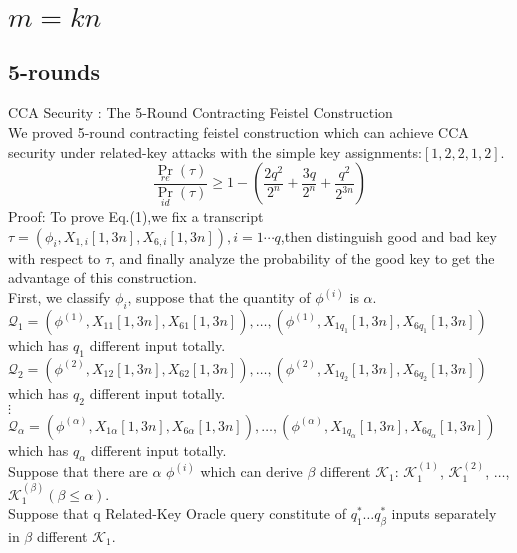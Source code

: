 \documentclass{article}
\begin{document}
\section{$m=kn$}
\subsection{5-rounds}
CCA Security : The 5-Round Contracting Feistel Construction\\
We proved 5-round contracting feistel construction which can achieve CCA security under related-key attacks with the simple key assignments:$[1,2,2,1,2]$.\\
\begin{equation}
\frac{\Pr_{re}(\tau)}{\Pr_{id}(\tau)}\geq 1-( \frac{2q^{2}}{2^{n}}+\frac{3q}{2^{n}} +\frac{q^{2}}{2^{3n}})
\end{equation}
Proof:
To prove Eq.(1),we fix a transcript $\tau=(\phi_{i},X_{1,i}[1,3n],X_{6,i}[1,3n]),i=1\cdots q$,then distinguish good and bad key with respect to $\tau$, and finally analyze the probability of the good key to get the advantage of this construction.\\


First, we classify $\phi_{i}$, suppose that the quantity of $\phi^{(i)}$ is $\alpha$.\\
$\mathcal{Q}_{1}={(\phi^{(1)},X_{11}[1,3n],X_{61}[1,3n]),\dots,(\phi^{(1)},X_{1q_{1}}[1,3n],X_{6q_{1}}[1,3n])}$ which has $q_{1}$ different input totally.\\
$\mathcal{Q}_{2}={(\phi^{(2)},X_{12}[1,3n],X_{62}[1,3n]),\dots,(\phi^{(2)},X_{1q_{2}}[1,3n],X_{6q_{2}}[1,3n])}$    which has $q_{2}$ different input totally.\\
\quad \quad $\vdots$ \\
$\mathcal{Q}_{\alpha}={(\phi^{(\alpha)},X_{1\alpha}[1,3n],X_{6\alpha}[1,3n]),\dots,(\phi^{(\alpha)},X_{1q_{\alpha}}[1,3n],X_{6q_{\alpha}}[1,3n])}$ which has $q_{\alpha}$ different input totally.\\

Suppose that there are $\alpha$ $\phi^{(i)}$ which can derive $\beta$ different $\mathcal{K}_{1}$: $\mathcal{K}_{1}^{(1)}$, $\mathcal{K}_{1}^{(2)}$, $\dots$,$\mathcal{K}_{1}^{(\beta)}$$(\beta\leq \alpha)$.\\
Suppose that q Related-Key Oracle query constitute of $q_{1}^{\ast} \dots q_{\beta}^{\ast}$ inputs separately in $\beta$ different $\mathcal{K}_{1}$.\\
\end{document}
